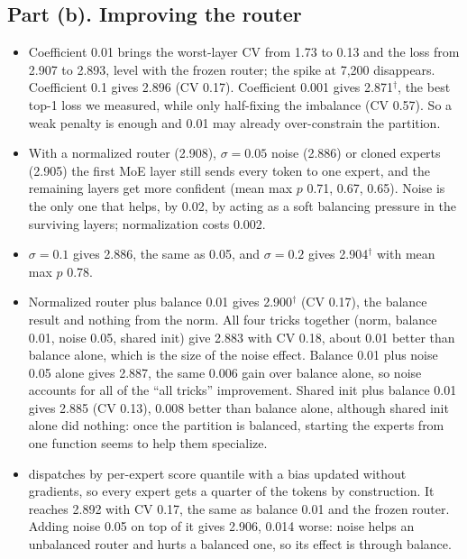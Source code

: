 \subsection*{Part (b). Improving the router}

\begin{itemize}
\item {} Coefficient 0.01 brings the worst-layer CV from 1.73 to 0.13 and the loss from 2.907 to 2.893, level with the frozen router; the spike at 7,200 disappears. Coefficient 0.1 gives 2.896 (CV 0.17). Coefficient 0.001 gives 2.871$^\dagger$, the best top-1 loss we measured, while only half-fixing the imbalance (CV 0.57). So a weak penalty is enough and 0.01 may already over-constrain the partition.
\item {} With a normalized router (2.908), $\sigma=0.05$ noise (2.886) or cloned experts (2.905) the first MoE layer still sends every token to one expert, and the remaining layers get more confident (mean max $p$ 0.71, 0.67, 0.65). Noise is the only one that helps, by 0.02, by acting as a soft balancing pressure in the surviving layers; normalization costs 0.002.
\item {} $\sigma=0.1$ gives 2.886, the same as 0.05, and $\sigma=0.2$ gives 2.904$^\dagger$ with mean max $p$ 0.78.
\item {} Normalized router plus balance 0.01 gives 2.900$^\dagger$ (CV 0.17), the balance result and nothing from the norm. All four tricks together (norm, balance 0.01, noise 0.05, shared init) give 2.883 with CV 0.18, about 0.01 better than balance alone, which is the size of the noise effect. Balance 0.01 plus noise 0.05 alone gives 2.887, the same 0.006 gain over balance alone, so noise accounts for all of the ``all tricks'' improvement. Shared init plus balance 0.01 gives 2.885 (CV 0.13), 0.008 better than balance alone, although shared init alone did nothing: once the partition is balanced, starting the experts from one function seems to help them specialize. %
\item {} dispatches by per-expert score quantile with a bias updated without gradients, so every expert gets a quarter of the tokens by construction. It reaches 2.892 with CV 0.17, the same as balance 0.01 and the frozen router. Adding noise 0.05 on top of it gives 2.906, 0.014 worse: noise helps an unbalanced router and hurts a balanced one, so its effect is through balance.
\end{itemize}

